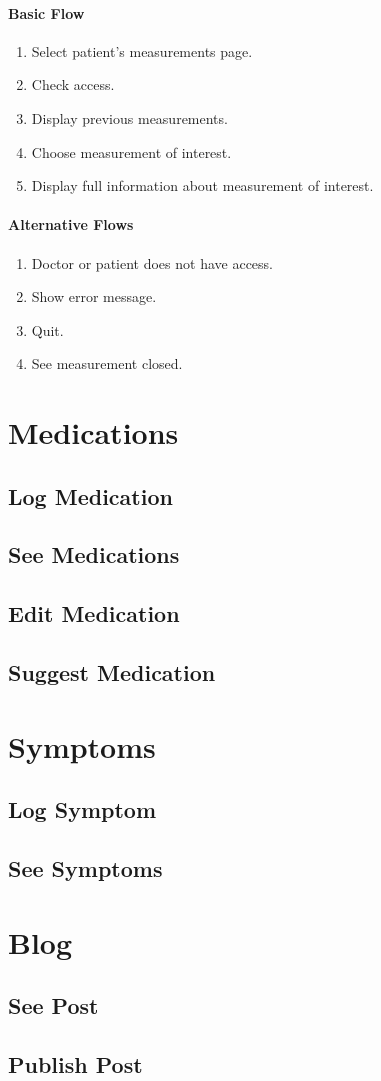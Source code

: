 \documentclass{report}
\begin{document}
\paragraph{Basic Flow}
\begin{enumerate}
    \item Select patient's measurements page.
    \item Check access.
    \item Display previous measurements.
    \item Choose measurement of interest.
    \item Display full information about measurement of interest.
\end{enumerate}

\paragraph{Alternative Flows}
\begin{enumerate}[label=A\arabic*.]
    \item Doctor or patient does not have access.
    \item Show error message.
    \item Quit.
    \item See measurement closed.
\end{enumerate}

\section{Medications}
\subsection{Log Medication}
\subsection{See Medications}
\subsection{Edit Medication}
\subsection{Suggest Medication}

\section{Symptoms}
\subsection{Log Symptom}
\subsection{See Symptoms}

\section{Blog}
\subsection{See Post}
\subsection{Publish Post}
\end{document}
